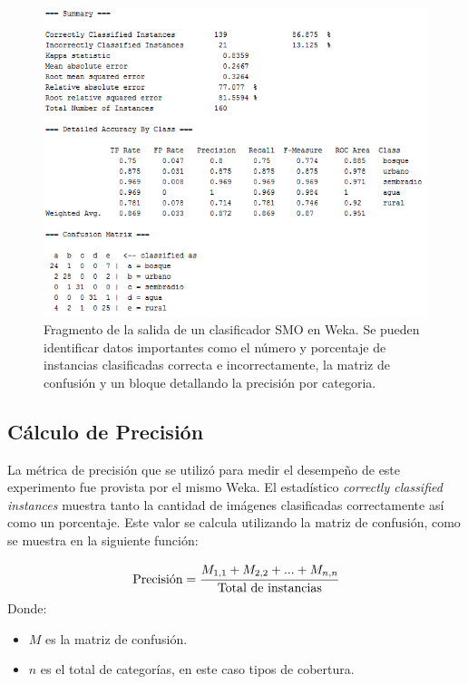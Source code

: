 \begin{figure}[h!]
    \centering
    \includegraphics[width=1\textwidth]{images/salida-SMO.png}
    \caption{Fragmento de la salida de un clasificador SMO en Weka. Se pueden identificar datos importantes como el número y porcentaje de instancias clasificadas correcta e incorrectamente, la matriz de confusión y un bloque detallando la precisión por categoria.}
    \label{fig:salida-SMO}
\end{figure}

\subsection{Cálculo de Precisión}

La métrica de precisión que se utilizó para medir el desempeño de este experimento fue provista por el mismo Weka. El estadístico \textit{correctly classified instances} muestra tanto la cantidad de imágenes clasificadas correctamente así como un porcentaje. Este valor se calcula utilizando la matriz de confusión, como se muestra en la siguiente función:

\begin{equation}
  \text{Precisión} = \cfrac{ M_{1,1} + M_{2,2} + ... + M_{n,n}}{\text{Total de instancias}}
\end{equation}
Donde:
\begin{itemize}
    \item $M$ es la matriz de confusión.
    \item $n$ es el total de categorías, en este caso tipos de cobertura.
\end{itemize}
  

